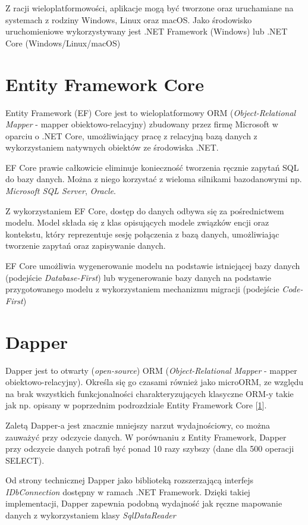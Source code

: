 Z racji wieloplatformowości, aplikacje mogą być tworzone oraz uruchamiane na systemach z rodziny Windows, Linux oraz macOS. Jako środowisko uruchomieniowe wykorzystywany jest .NET Framework (Windows) lub .NET Core (Windows/Linux/macOS) \cite{RefWorks:9}\cite{Introduc95:online}
 

\section{Entity Framework Core}
\label{sec:entityCore}
Entity Framework (EF) Core jest to wieloplatformowy ORM (\textit{Object-Relational Mapper} - mapper obiektowo-relacyjny) zbudowany przez firmę Microsoft w oparciu o .NET Core, umożliwiający pracę z relacyjną bazą danych z wykorzystaniem natywnych obiektów ze środowiska .NET.

EF Core prawie całkowicie eliminuje konieczność tworzenia ręcznie zapytań SQL do bazy danych. Można z niego korzystać z wieloma silnikami bazodanowymi np. \textit{Microsoft SQL Server}, \textit{Oracle}.

Z wykorzystaniem EF Core, dostęp do danych odbywa się za pośrednictwem modelu. Model składa się z klas opisujących modele związków encji oraz kontekstu, który reprezentuje sesję połączenia z bazą danych, umożliwiając tworzenie zapytań oraz zapisywanie danych.

EF Core umożliwia wygenerowanie modelu na podstawie istniejącej bazy danych (podejście \textit{Database-First}) lub wygenerowanie bazy danych na podstawie przygotowanego modelu z wykorzystaniem mechanizmu migracji (podejście \textit{Code-First})\cite{QuickOve99:online}

\section{Dapper}
\label{sec:dapper}
Dapper jest to otwarty (\textit{open-source}) ORM (\textit{Object-Relational Mapper} - mapper obiektowo-relacyjny). Określa się go czasami również jako microORM, ze względu na brak wszystkich funkcjonalności charakteryzujących klasyczne ORM-y takie jak np. opisany w poprzednim podrozdziale Entity Framework Core [\ref{sec:entityCore}]. 

Zaletą Dapper-a jest znacznie mniejszy narzut wydajnościowy, co można zauważyć przy odczycie danych. W porównaniu z Entity Framework, Dapper przy odczycie danych potrafi być ponad 10 razy szybszy (dane dla 500 operacji SELECT).

Od strony technicznej Dapper jako biblioteką rozszerzającą interfejs \textit{IDbConnection} dostępny w ramach .NET Framework. Dzięki takiej implementacji, Dapper zapewnia podobną wydajność jak ręczne mapowanie danych z wykorzystaniem klasy \textit{SqlDataReader} \cite{StackExc69:online}  
